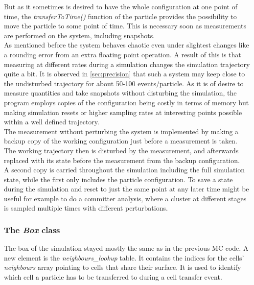 But as it sometimes is desired to have the whole configuration at one point of time, the \textit{transferToTime()} function of the particle provides the possibility to move the particle to some point of time. This is necessary soon as measurements are performed on the system, including snapshots.\\

As mentioned before the system behaves chaotic even under slightest changes like a rounding error from an extra floating point operation. A result of this is that measuring at different rates during a simulation changes the simulation trajectory quite a bit. It is observed in \autoref{sec:precision} that such a system may keep close to the undisturbed trajectory for about 50-100 events/particle. As it is of desire to measure quantities and take snapshots without disturbing the simulation, the program employs copies of the configuration being costly in terms of memory but making simulation resets or higher sampling rates at interesting points possible within a well defined trajectory.\\ 

The measurement without perturbing the system is implemented by making a backup copy of the working configuration just before a measurement is taken. The working trajectory then is disturbed by the measurement, and afterwards replaced with its state before the measurement from the backup configuration.\\
A second copy is carried throughout the simulation including the full simulation state, while the first only includes the particle configuration. To save a state during the simulation and reset to just the same point at any later time might be useful for example to do a committer analysis, where a cluster at different stages is sampled multiple times with different perturbations.\\


\subsubsection{The \textit{Box} class}
\label{sec:box_class}
The box of the simulation stayed mostly the same as in the previous MC code. A new element is the \textit{neighbours\_lookup} table. It contains the indices for the cells' \textit{neighbours} array pointing to cells that share their surface. It is used to identify which cell a particle has to be transferred to during a cell transfer event.\\

